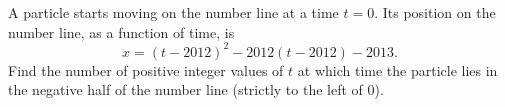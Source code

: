 A particle starts moving on the number line at a time $t = 0$. Its position on the number line, as a function of time, is $$x = (t-2012)^2 -2012(t-2012)-2013.$$Find the number of positive integer values of $t$ at which time the particle lies in the negative half of the number line (strictly to the left of $0$).
